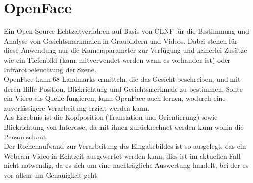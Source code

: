 \section{OpenFace}
\label{OpenFace}
Ein Open-Source Echtzeitverfahren auf Basis von CLNF für die Bestimmung und Analyse von Gesichtsmerkmalen in Graubildern und Videos. Dabei stehen für diese Anwendung nur die Kameraparameter zur Verfügung und keinerlei Zusätze wie ein Tiefenbild (kann mitverwendet werden wenn es vorhanden ist) oder Infrarotbeleuchtung der Szene.\\
OpenFace kann 68 Landmarks ermitteln, die das Gesicht beschreiben, und mit deren Hilfe Position, Blickrichtung und Gesichtsmerkmale zu bestimmen. Sollte ein Video als Quelle fungieren, kann OpenFace auch lernen, wodurch eine zuverlässigere Verarbeitung erzielt werden kann.\\
Als Ergebnis ist die Kopfposition (Translation und Orientierung) sowie Blickrichtung von Interesse, da mit ihnen zurückrechnet werden kann wohin die Person schaut.\\
Der Rechenaufwand zur Verarbeitung des Eingabebildes ist so ausgelegt, das ein Webcam-Video in Echtzeit ausgewertet werden kann, dies ist im aktuellen Fall nicht notwendig, da es sich um eine nachträgliche Auswertung handelt, bei der es vor allem um Genauigkeit geht.
